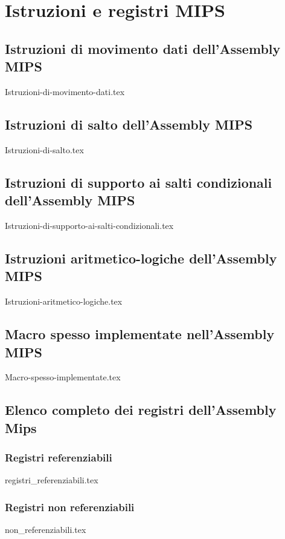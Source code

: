 \documentclass[class=book, crop=false, oneside]{standalone}
\begin{document}
\chapter{Istruzioni e registri MIPS}

\section*{Istruzioni di movimento dati dell'Assembly MIPS}
\begin{table}[H]
	\centering
	{Istruzioni-di-movimento-dati.tex}
\end{table}

\section*{Istruzioni di salto dell'Assembly MIPS}
\begin{table}[H]
	\centering
	{Istruzioni-di-salto.tex}
\end{table}

\section*{Istruzioni di supporto ai salti condizionali dell'Assembly MIPS}
\begin{table}[H]
	\centering
	{Istruzioni-di-supporto-ai-salti-condizionali.tex}
\end{table}

\section*{Istruzioni aritmetico-logiche dell'Assembly MIPS}
\begin{table}[H]
	\centering
	{Istruzioni-aritmetico-logiche.tex}
\end{table}

\section*{Macro spesso implementate nell'Assembly MIPS}
\begin{table}[H]
	\centering
	{Macro-spesso-implementate.tex}
\end{table}

\section*{Elenco completo dei registri dell'Assembly Mips}
\subsection*{Registri referenziabili}
\begin{table}[H]
	\centering
	{registri_referenziabili.tex}
\end{table}
\subsection*{Registri non referenziabili}
\begin{table}[H]
	\centering
	{non_referenziabili.tex}
\end{table}
\end{document}
